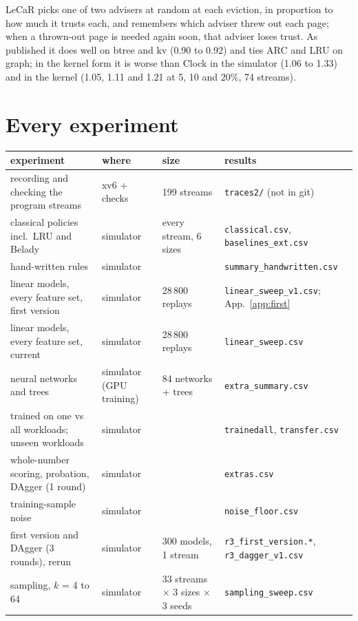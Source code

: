 \documentclass[10.5pt,a4paper]{article}
\newcommand{\code}[1]{\texttt{#1}}
\begin{document}
LeCaR picks one of two advisers at random at each eviction, in proportion to how much it trusts each, and remembers which adviser threw out each page; when a thrown-out page is needed again soon, that adviser loses trust.
As published it does well on btree and kv (0.90 to 0.92) and ties ARC and LRU on graph; in the kernel form it is worse than Clock in the simulator (1.06 to 1.33) and in the kernel (1.05, 1.11 and 1.21 at 5, 10 and 20\%, 74 streams).

\section{Every experiment}
\label{app:inventory}

\begin{center}\scriptsize
\begin{tabular}{p{5.3cm}p{2.1cm}p{3.4cm}p{4.2cm}}
\toprule
experiment & where & size & results \\
\midrule
recording and checking the program streams & xv6 + checks & 199 streams & \code{traces2/} (not in git) \\
classical policies incl.\ LRU and Belady & simulator & every stream, 6 sizes & \code{classical.csv}, \code{baselines\_ext.csv} \\
hand-written rules & simulator & & \code{summary\_handwritten.csv} \\
linear models, every feature set, first version & simulator & 28\,800 replays & \code{linear\_sweep\_v1.csv}; App.~\ref{app:first} \\
linear models, every feature set, current & simulator & 28\,800 replays & \code{linear\_sweep.csv} \\
neural networks and trees & simulator (GPU training) & 84 networks + trees & \code{extra\_summary.csv} \\
trained on one vs all workloads; unseen workloads & simulator & & \code{trainedall}, \code{transfer.csv} \\
whole-number scoring, probation, DAgger (1 round) & simulator & & \code{extras.csv} \\
training-sample noise & simulator & & \code{noise\_floor.csv} \\
first version and DAgger (3 rounds), rerun & simulator & 300 models, 1 stream & \code{r3\_first\_version.*}, \code{r3\_dagger\_v1.csv} \\
sampling, $k$ = 4 to 64 & simulator & 33 streams $\times$ 3 sizes $\times$ 3 seeds & \code{sampling\_sweep.csv} \\

\end{tabular}
\end{center}
\end{document}
